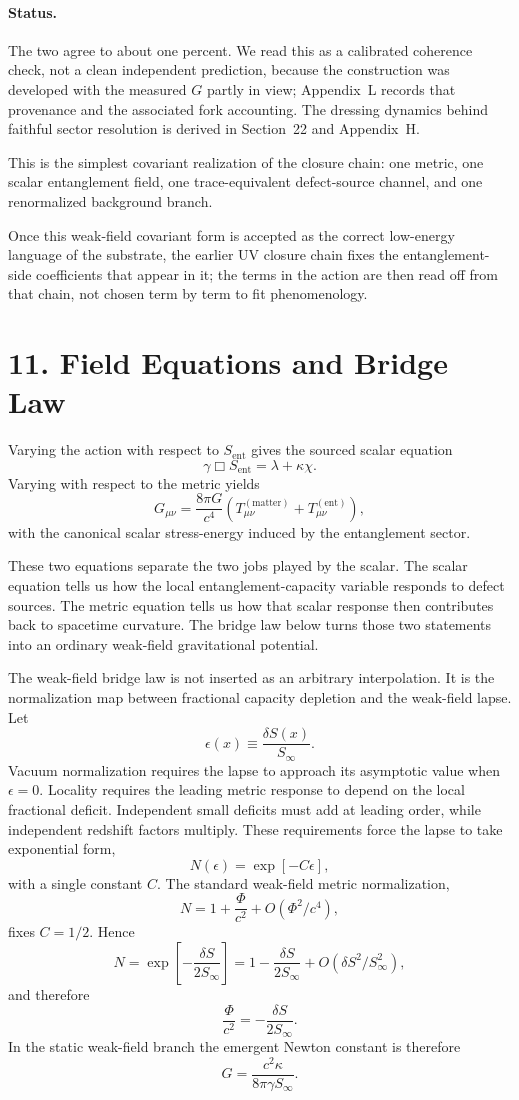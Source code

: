 \documentclass[11pt]{article}
\begin{document}
\paragraph{Status.} The two agree to about one percent. We read this as a calibrated coherence check, not a clean independent prediction, because the construction was developed with the measured $G$ partly in view; Appendix~L records that provenance and the associated fork accounting. The dressing dynamics behind faithful sector resolution is derived in Section~22 and Appendix~H.

This is the simplest covariant realization of the closure chain: one metric, one scalar entanglement field, one trace-equivalent defect-source channel, and one renormalized background branch.

Once this weak-field covariant form is accepted as the correct low-energy language of the substrate, the earlier UV closure chain fixes the entanglement-side coefficients that appear in it; the terms in the action are then read off from that chain, not chosen term by term to fit phenomenology.

\section{11. Field Equations and Bridge Law}

Varying the action with respect to $S_{\mathrm{ent}}$ gives the sourced scalar equation
\[
\gamma\Box S_{\mathrm{ent}}=\lambda+\kappa\chi.
\]
Varying with respect to the metric yields
\[
G_{\mu\nu}=\frac{8\pi G}{c^4}
\left(
T_{\mu\nu}^{(\mathrm{matter})}
+T_{\mu\nu}^{(\mathrm{ent})}
\right),
\]
with the canonical scalar stress-energy induced by the entanglement sector.

These two equations separate the two jobs played by the scalar. The scalar equation tells us how the local entanglement-capacity variable responds to defect sources. The metric equation tells us how that scalar response then contributes back to spacetime curvature. The bridge law below turns those two statements into an ordinary weak-field gravitational potential.

The weak-field bridge law is not inserted as an arbitrary interpolation. It is the normalization map between fractional capacity depletion and the weak-field lapse. Let
\[
\epsilon(x)\equiv\frac{\delta S(x)}{S_\infty}.
\]
Vacuum normalization requires the lapse to approach its asymptotic value when $\epsilon=0$. Locality requires the leading metric response to depend on the local fractional deficit. Independent small deficits must add at leading order, while independent redshift factors multiply. These requirements force the lapse to take exponential form,
\[
N(\epsilon)=\exp[-C\epsilon],
\]
with a single constant $C$. The standard weak-field metric normalization,
\[
N=1+\frac{\Phi}{c^2}+O(\Phi^2/c^4),
\]
fixes $C=1/2$. Hence
\[
N=\exp\!\left[-\frac{\delta S}{2S_\infty}\right]
=1-\frac{\delta S}{2S_\infty}
 +O(\delta S^2/S_\infty^2),
\]
and therefore
\[
\frac{\Phi}{c^2}=-\frac{\delta S}{2S_\infty}.
\]
In the static weak-field branch the emergent Newton constant is therefore
\[
G=\frac{c^2\kappa}{8\pi\gamma S_\infty}.
\]
\end{document}

